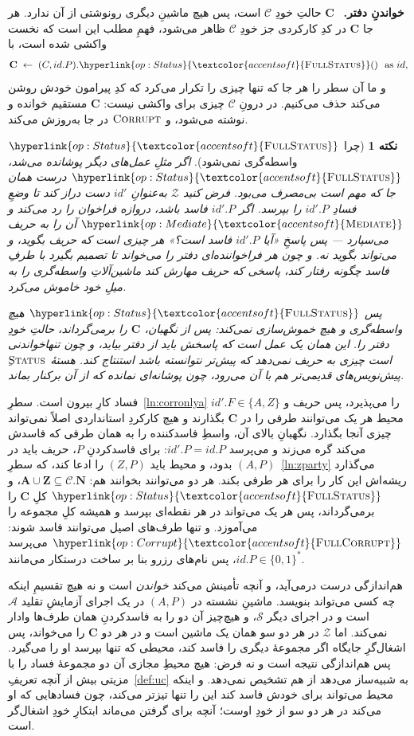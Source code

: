 \documentclass[10pt,oneside,openany]{book}
\newcommand{\admits}{\mathbf{N}}
\newcommand{\Apid}{\mathbf{A}}
\newcommand{\Zpid}{\mathbf{Z}}
\newcommand{\Cs}{\mathbf{C}}
\newcommand{\Corr}{\mathcal{C}}
\newcommand{\Zenv}{\mathcal{Z}}
\newcommand{\Adv}{\mathcal{A}}
\newcommand{\Sim}{\mathcal{S}}
\newcommand{\op}[1]{\textnormal{\textsc{#1}}}
\newcommand{\opl}[1]{\hyperlink{op:#1}{\textcolor{accentsoft}{\op{#1}}}}
\newcommand{\fopl}[1]{\hyperlink{op:#1}{\textcolor{accentsoft}{\op{Full}\op{#1}}}}
\newcommand{\id}{id}
\newcommand{\bits}{\{0,1\}^*}
\newcommand{\heading}[1]{\medskip\par\noindent\textcolor{accent}{\textbf{#1.}}\ }
\theoremstyle{accentdef}
\newtheorem{remark}[definition]{نکته}
\theoremstyle{accentplain}
\begin{document}
\heading{خواندنِ دفتر} $\Cs$ حالتِ خودِ $\Corr$ است، پس هیچ ماشینِ دیگری
رونوشتی از آن ندارد. هر جا $\Cs$ در کدِ کارکردی جز خودِ $\Corr$ ظاهر
می‌شود، فهمِ مطلب این است که نخست واکشی شده است، با
\[
  \Cs \;\gets\; (C,\id.P).\fopl{Status}() \ \text{ as } \id ,
\]
و ما آن سطر را هر جا که تنها چیزی را تکرار می‌کرد که کدِ پیرامون خودش
روشن می‌کند حذف می‌کنیم. در درونِ $\Corr$ چیزی برای واکشی نیست: $\Cs$
مستقیم خوانده و نوشته می‌شود، و $\op{Corrupt}$ در جا به‌روزش می‌کند.

\begin{remark}[چرا $\fopl{Status}$ واسطه‌گری نمی‌شود]\label{rem:statusmed}
اگر مثلِ عمل‌های دیگر پوشانده می‌شد، $\fopl{Status}$ درست همان جا که مهم
است بی‌مصرف می‌بود. فرض کنید $\Zenv$ به‌عنوانِ $\id'$ دست دراز کند تا
وضعِ فسادِ $\id'.P$ را بپرسد. اگر $\id'.P$ فاسد باشد، دروازه فراخوان را
رد می‌کند و $\opl{Mediate}$ آن را به حریف می‌سپارد --- پس پاسخِ «آیا
$\id'.P$ فاسد است؟» هر چیزی است که حریف بگوید، و می‌تواند بگوید نه. و چون
هر فراخواننده‌ای دفتر را می‌خواند تا تصمیم بگیرد با طرفِ فاسد چگونه رفتار
کند، پاسخی که حریف مهارش کند ماشین‌آلاتِ واسطه‌گری را به میلِ خود خاموش
می‌کرد.

پس $\fopl{Status}$ هیچ واسطه‌گری و هیچ خموش‌سازی نمی‌کند: پس از نگهبان،
$\Cs$ را برمی‌گرداند، حالتِ خودِ دفتر را. این همان یک عمل است که پاسخش
باید از دفتر بیاید، و چون تنها‌خواندنی است چیزی به حریف نمی‌دهد که پیش‌تر
نتوانسته باشد استنتاج کند. هستهٔ $\op{Status}$ِ پیش‌نویس‌های قدیمی‌تر هم با
آن می‌رود، چون پوشانه‌ای نمانده که از آن برکنار بماند.
\end{remark}

فساد کارِ بیرون است. سطرِ~\ref{ln:corronlya} $\id'.F \in \{A,Z\}$ را
می‌پذیرد، پس حریف و محیط هر یک می‌توانند طرفی را در $\Cs$ بگذارند و هیچ
کارکردِ استانداردی اصلاً نمی‌تواند چیزی آنجا بگذارد. نگهبانِ بالای آن،
واسطِ فاسدکننده را به همان طرفی که فاسدش می‌کند گره می‌زند و می‌پرسد
$\id'.P = \id.P$: برای فاسدکردنِ $P$، حریف باید در $(A,P)$ بدود، و محیط
باید $(Z,P)$ را ادعا کند، که سطرِ~\ref{ln:zparty} می‌گذارد ریشه‌اش این
کار را برای هر طرفی بکند. هر دو می‌توانند بخوانند هم: $\Apid \cup \Zpid
\subseteq \Corr.\admits$، و $\fopl{Status}$ کلِ $\Cs$ را برمی‌گرداند، پس
هر یک می‌تواند در هر نقطه‌ای بپرسد و همیشه کلِ مجموعه را می‌آموزد. و تنها
طرف‌های اصیل می‌توانند فاسد شوند: $\fopl{Corrupt}$ می‌پرسد $\id.P \in
\bits$، پس نام‌های رزرو بنا بر ساخت درستکار می‌مانند.

هم‌اندازگی درست درمی‌آید، و آنچه تأمینش می‌کند \emph{خواندن} است و نه
هیچ تقسیمِ اینکه چه کسی می‌تواند بنویسد. ماشینِ نشسته در $(A,P)$ در یک
اجرای آزمایشِ تقلید $\Adv$ است و در اجرای دیگر $\Sim$، و هیچ‌چیز آن دو را
به فاسدکردنِ همان طرف‌ها وادار نمی‌کند. اما $\Zenv$ در هر دو سو همان یک
ماشین است و در هر دو $\Cs$ را می‌خواند، پس اشغال‌گرِ جایگاه اگر مجموعهٔ
دیگری را فاسد کند، محیطی که تنها بپرسد او را می‌گیرد. پس هم‌اندازگی
نتیجه است و نه فرض: هیچ محیطِ مجازی آن دو مجموعهٔ فساد را با مزیتی بیش از
آنچه تعریفِ~\ref{def:uc} به شبیه‌ساز می‌دهد از هم تشخیص نمی‌دهد. و اینکه
محیط می‌تواند برای خودش فاسد کند این را تنها تیزتر می‌کند، چون فسادهایی که
او می‌کند در هر دو سو از خودِ اوست؛ آنچه برای گرفتن می‌ماند ابتکارِ خودِ
اشغال‌گر است.
\end{document}
